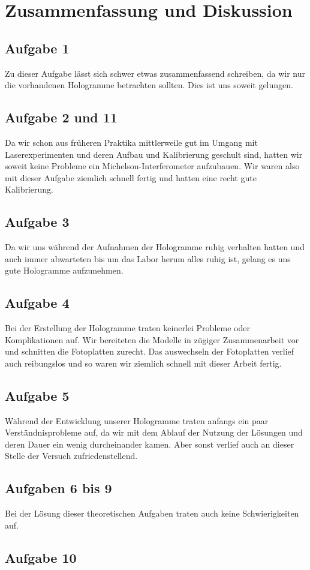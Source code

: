 \section{Zusammenfassung und Diskussion}

\subsection{Aufgabe 1}
Zu dieser Aufgabe lässt sich schwer etwas zusammenfassend schreiben, da wir nur die vorhandenen Hologramme betrachten sollten. Dies ist uns soweit gelungen.

\subsection{Aufgabe 2 und 11}
Da wir schon aus früheren Praktika mittlerweile gut im Umgang mit Laserexperimenten und deren Aufbau und Kalibrierung geschult sind, hatten wir soweit keine Probleme ein Michelson-Interferometer aufzubauen. Wir waren also mit dieser Aufgabe ziemlich schnell fertig und hatten eine recht gute Kalibrierung.

\subsection{Aufgabe 3}
Da wir uns während der Aufnahmen der Hologramme ruhig verhalten hatten und auch immer abwarteten  bis um das Labor herum alles ruhig ist, gelang es uns gute Hologramme aufzunehmen.

\subsection{Aufgabe 4}
Bei der Erstellung der Hologramme traten keinerlei Probleme oder Komplikationen auf. Wir bereiteten die Modelle in zügiger Zusammenarbeit vor und schnitten die Fotoplatten zurecht. Das auswechseln der Fotoplatten verlief auch reibungslos und so waren wir ziemlich schnell mit dieser Arbeit fertig.

\subsection{Aufgabe 5}
Während der Entwicklung unserer Hologramme traten anfangs ein paar Verständnisprobleme auf, da wir mit dem Ablauf der Nutzung der Lösungen und deren Dauer ein wenig durcheinander kamen. Aber sonst verlief auch an dieser Stelle der Versuch zufriedenstellend.

\subsection{Aufgaben 6 bis 9}
Bei der Lösung dieser theoretischen Aufgaben traten auch keine Schwierigkeiten auf.

\subsection{Aufgabe 10}
